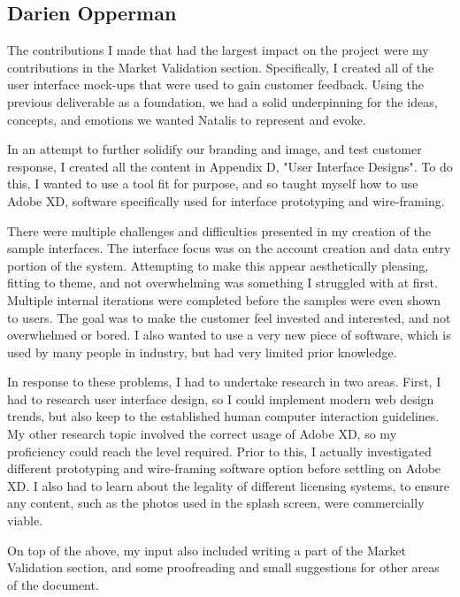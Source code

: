 \documentclass[10pt,a4paper]{article}
\begin{document}
\begin{appendices}
\clearpage
\subsection{Darien Opperman}\label{subsec:darienOpperman}
The contributions I made that had the largest impact on the project were my contributions in the Market Validation section. Specifically, I created all of the user interface mock-ups that were used to gain customer feedback. Using the previous deliverable as a foundation, we had a solid underpinning for the ideas, concepts, and emotions we wanted Natalis to represent and evoke. 

In an attempt to further solidify our branding and image, and test customer response, I created all the content in Appendix D, "User Interface Designs". To do this, I wanted to use a tool fit for purpose, and so taught myself how to use Adobe XD, software specifically used for interface prototyping and wire-framing. 

There were multiple challenges and difficulties presented in my creation of the sample interfaces. The interface focus was on the account creation and data entry portion of the system. Attempting to make this appear aesthetically pleasing, fitting to theme, and not overwhelming was something I struggled with at first. Multiple internal iterations were completed before the samples were even shown to users. The goal was to make the customer feel invested and interested, and not overwhelmed or bored. I also wanted to use a very new piece of software, which is used by many people in industry, but had very limited prior knowledge.

In response to these problems, I had to undertake research in two areas. First, I had to research user interface design, so I could implement modern web design trends, but also keep to the established human computer interaction guidelines. My other research topic involved the correct usage of Adobe XD, so my proficiency could reach the level required. Prior to this, I actually investigated different prototyping and wire-framing software option before settling on Adobe XD. I also had to learn about the legality of different licensing systems, to ensure any content, such as the photos used in the splash screen, were commercially viable.

On top of the above, my input also included writing a part of the Market Validation section, and some proofreading and small suggestions for other areas of the document.
\end{appendices}
\end{document}
